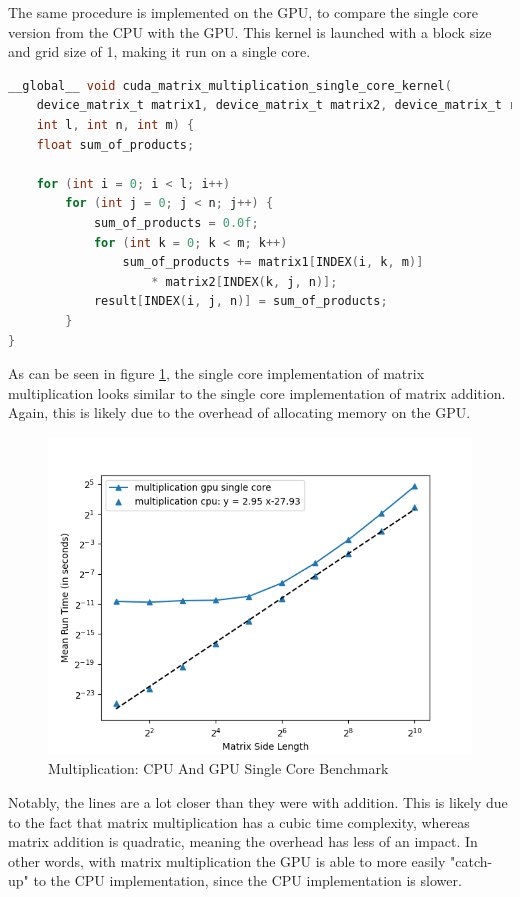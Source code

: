 The same procedure is implemented on the GPU, to compare the single core version from the CPU with the GPU. This kernel is launched with a block size and grid size of 1, making it run on a single core.

\begin{lstlisting}[language=C, caption={Matrix Multiplication on the gpu}, label={lst:matrix_multiplication_gpu}]
__global__ void cuda_matrix_multiplication_single_core_kernel(
    device_matrix_t matrix1, device_matrix_t matrix2, device_matrix_t result,
    int l, int n, int m) {
    float sum_of_products;

    for (int i = 0; i < l; i++)
        for (int j = 0; j < n; j++) {
            sum_of_products = 0.0f;
            for (int k = 0; k < m; k++)
                sum_of_products += matrix1[INDEX(i, k, m)] 
                    * matrix2[INDEX(k, j, n)];
            result[INDEX(i, j, n)] = sum_of_products;
        }
}
\end{lstlisting}

As can be seen in figure \ref{fig:mul_cpu_bench}, the single core implementation of matrix multiplication looks similar to the single core implementation of matrix addition. Again, this is likely due to the overhead of allocating memory on the GPU.

\begin{figure}[h]
  \includegraphics[width=.70\textwidth]{SavedBenchmarksAndDiagrams/Machine 2/Multiplication/CPU, GPU SC.png}
  \centering
  \caption{Multiplication: CPU And GPU Single Core Benchmark}
  \label{fig:mul_cpu_bench}
\end{figure}

Notably, the lines are a lot closer than they were with addition. This is likely due to the fact that matrix multiplication has a cubic time complexity, whereas matrix addition is quadratic, meaning the overhead has less of an impact. In other words, with matrix multiplication the GPU is able to more easily "catch-up" to the CPU implementation, since the CPU implementation is slower.

